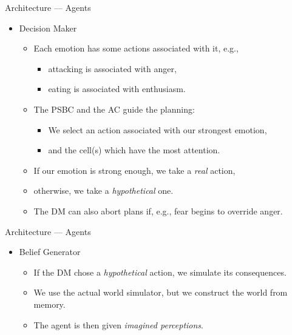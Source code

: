 \documentclass{beamer}
\def\tikzoverlay{%
   \tikz[baseline,overlay]\node[every overlay node]
}%
\begin{document}
   \begin{frame}{Architecture --- Agents}
      \begin{itemize}
         \item Decision Maker
            \begin{itemize}
               \item Each emotion has some actions associated with it, e.g.,
               \begin{itemize}
                  \item attacking is associated with anger,
                  \item eating is associated with enthusiasm.
               \end{itemize}
               \pause
               \item The PSBC and the AC guide the planning:
               \begin{itemize}
                  \item We select an action associated with our strongest emotion,
                  \item and the cell(s) which have the most attention.
               \end{itemize}
               \pause
               \item If our emotion is strong enough, we take a \emph{real} action,
               \item otherwise, we take a \emph{hypothetical} one.
               \vspace{2mm}
               \item The DM can also abort plans if, e.g., fear begins to override anger.
            \end{itemize}
      \end{itemize}
      
   \end{frame}
   
   \begin{frame}{Architecture --- Agents}
      \begin{itemize}
         \item Belief Generator
         \begin{itemize}
            \item If the DM chose a \emph{hypothetical} action, we simulate its consequences.
            \item We use the actual world simulator, but we construct the world from memory.
            \item The agent is then given \emph{imagined perceptions}.
         \end{itemize}
      \end{itemize}
      
   \end{frame}
   
\end{document}
